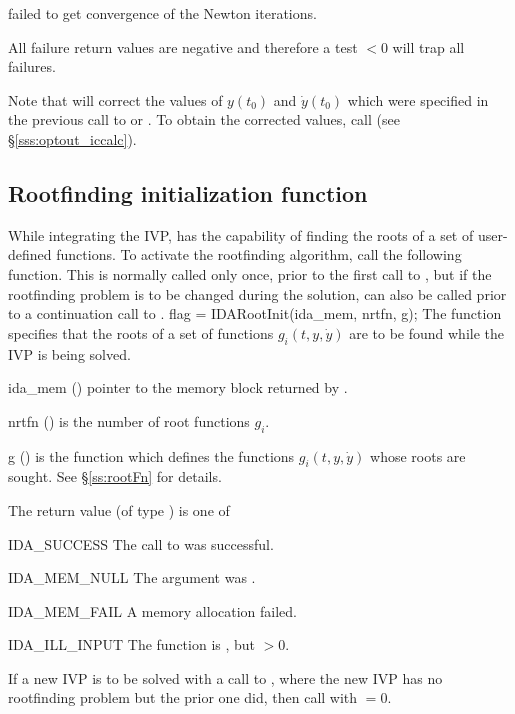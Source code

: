 {{\begin{args}
  \item[\Id{IDA\_CONV\_FAIL}]
     failed to get convergence of the Newton iterations.

  \end{args}
}
{
  All failure return values are negative and therefore a test  $< 0$
  will trap all  failures.

  Note that  will correct the values of $y(t_0)$ and $\dot{y}(t_0)$
  which were specified in the previous call to  or .
  To obtain the corrected values, call  (see \S\ref{sss:optout_iccalc}).
}


\subsection{Rootfinding initialization function}\label{ss:idarootinit}

While integrating the IVP, {\ida} has the capability of finding the
roots of a set of user-defined functions. To activate the rootfinding
algorithm, call the following function.  This is normally called only
once, prior to the first call to , but if the rootfinding
problem is to be changed during the solution,  can also
be called prior to a continuation call to .
{
  flag = IDARootInit(ida\_mem, nrtfn, g);
}
{
  The function  specifies that the roots of a set of
  functions $g_i(t,y,\dot{y})$ are to be found while the IVP is being solved.
}
{
  \begin{args}
  \item[ida\_mem] ()
    pointer to the {\ida} memory block returned by .
  \item[nrtfn] ()
    is the number of root functions $g_i$.
  \item[g] ()
    is the {\CC} function which defines the  functions $g_i(t,y,\dot{y})$
    whose roots are sought. See \S\ref{ss:rootFn} for details.
 \end{args}
}
{
  The return value  (of type ) is one of
  \begin{args}
  \item[IDA\_SUCCESS]
    The call to  was successful.
  \item[IDA\_MEM\_NULL]
    The  argument was .
  \item[IDA\_MEM\_FAIL]
    A memory allocation failed.
  \item[IDA\_ILL\_INPUT]
    The function  is , but $>0$.
  \end{args}
}
{
  If a new IVP is to be solved with a call to , where the new
  IVP has no rootfinding problem but the prior one did, then call
   with $=0$.
}


}
